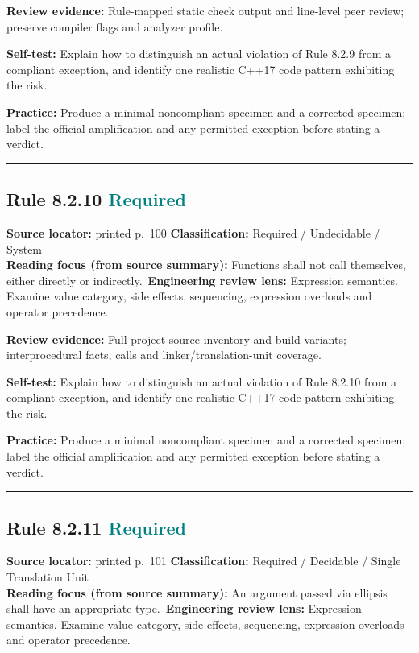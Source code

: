 \documentclass[10pt,letterpaper]{article}
\begin{document}
\textbf{Review evidence:} Rule-mapped static check output and line-level peer review; preserve compiler flags and analyzer profile.

\textbf{Self-test:} Explain how to distinguish an actual violation of Rule 8.2.9 from a compliant exception, and identify one realistic C++17 code pattern exhibiting the risk.\par
\textbf{Practice:} Produce a minimal noncompliant specimen and a corrected specimen; label the official amplification and any permitted exception before stating a verdict.
\smallskip\hrule\smallskip
\subsection*{Rule 8.2.10 \enspace \texorpdfstring{\small\textcolor{teal}{Required}}{Required}}
\noindent\textbf{Source locator:} printed p.~100 \quad\textbf{Classification:} Required / Undecidable / System\\
\textbf{Reading focus (from source summary):} Functions shall not call themselves, either directly or indirectly.\
\textbf{Engineering review lens:} Expression semantics. Examine value category, side effects, sequencing, expression overloads and operator precedence.

\textbf{Review evidence:} Full-project source inventory and build variants; interprocedural facts, calls and linker/translation-unit coverage.

\textbf{Self-test:} Explain how to distinguish an actual violation of Rule 8.2.10 from a compliant exception, and identify one realistic C++17 code pattern exhibiting the risk.\par
\textbf{Practice:} Produce a minimal noncompliant specimen and a corrected specimen; label the official amplification and any permitted exception before stating a verdict.
\smallskip\hrule\smallskip
\subsection*{Rule 8.2.11 \enspace \texorpdfstring{\small\textcolor{teal}{Required}}{Required}}
\noindent\textbf{Source locator:} printed p.~101 \quad\textbf{Classification:} Required / Decidable / Single Translation Unit\\
\textbf{Reading focus (from source summary):} An argument passed via ellipsis shall have an appropriate type.\
\textbf{Engineering review lens:} Expression semantics. Examine value category, side effects, sequencing, expression overloads and operator precedence.
\end{document}

